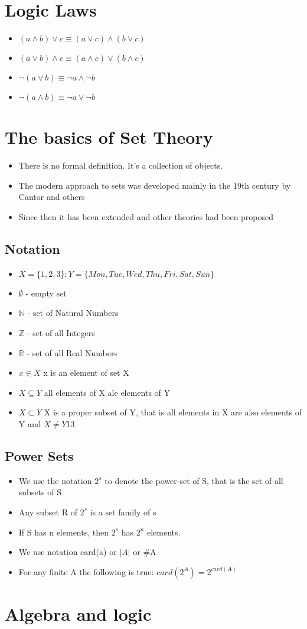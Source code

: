 \documentclass{article}
\begin{document}
\section{Logic Laws}
\begin{itemize}
	\item $(a \land b) \lor c \equiv (a \lor c) \land (b \lor c)$
	\item $(a \lor b) \land c \equiv (a \land c) \lor (b \land c)$
	\item $\lnot (a \lor b) \equiv \lnot a \land \lnot b$
	\item $\lnot (a \land b) \equiv \lnot a \lor \lnot b$
\end{itemize}
\section{The basics of Set Theory}
\begin{itemize}
	\item There is no formal definition. It's a collection of objects.
	\item The modern approach to sets was developed mainly in the 19th century by Cantor and others
	\item Since then it has been extended and other theories had been proposed
\end{itemize}
\subsection{Notation}
\begin{itemize}
	\item $X = \{1, 2, 3\}; Y=\{Mon, Tue, Wed, Thu, Fri, Sat, Sun\}$
	\item $\emptyset$ - empty set
	\item $\mathbb{N}$ - set of Natural Numbers
	\item $\mathbb{Z}$ - set of all Integers
	\item $\mathbb{R}$ - set of all Real Numbers
	\item $x \in X$ x is an element of set X
	\item $X \subseteq Y$ all elements of X ale elements of Y
	\item $X \subset Y$ X is a proper subset of Y, that is all elements in X are also elements of Y and $X \neq Y$13
\end{itemize}
\subsection{Power Sets}
\begin{itemize}
	\item We use the notation $2^s$ to denote the power-set of S, that is the set of all subsets of S
	\item Any subset R of $2^s$ is a set family of s
	\item If S has n elements, then $2^s$ has $2^n$ elements.
	\item We use notation card(a) or $|A|$ or \#A
	\item For any finite A the following is true: $card(2^A) = 2^{card(A)}$
\end{itemize}
\section{Algebra and logic}
\end{document}
